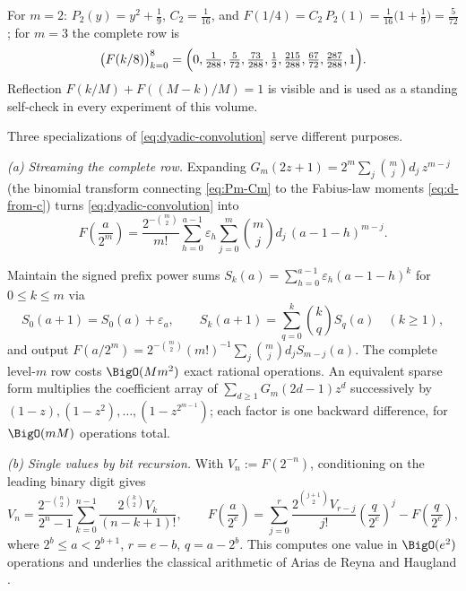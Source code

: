 \documentclass[11pt,oneside]{article}
\numberwithin{equation}{section}
\theoremstyle{definition}
\theoremstyle{remark}
\newcommand{\eps}{\varepsilon}
\begin{document}
\begin{example}
For $m=2$: $P_2(y)=y^2+\tfrac19$, $C_2=\tfrac1{16}$, and
$F(1/4)=C_2\,P_2(1)=\tfrac1{16}\bigl(1+\tfrac19\bigr)
=\tfrac5{72}$; for $m=3$ the complete row is
\[
 \bigl(F(k/8)\bigr)_{k=0}^{8}
 =\Bigl(0,\tfrac1{288},\tfrac5{72},\tfrac{73}{288},\tfrac12,
 \tfrac{215}{288},\tfrac{67}{72},\tfrac{287}{288},1\Bigr).
\]
Reflection $F(k/M)+F((M-k)/M)=1$ is visible and is used as a standing
self-check in every experiment of this volume.
\end{example}

Three specializations of \eqref{eq:dyadic-convolution} serve different
purposes.

\emph{(a) Streaming the complete row.}  Expanding
$G_m(2z+1)=2^m\sum_{j}\binom mj d_j\,z^{m-j}$ (the binomial transform
connecting \eqref{eq:Pm-Cm} to the Fabius-law moments
\eqref{eq:d-from-c}) turns \eqref{eq:dyadic-convolution} into
\begin{equation}
 F\!\left(\frac{a}{2^{m}}\right)
 =\frac{2^{-\binom m2}}{m!}
 \sum_{h=0}^{a-1}\eps_h
 \sum_{j=0}^{m}\binom mj d_j\,(a-1-h)^{m-j}.
 \label{eq:exact-dyadic-d}
\end{equation}

\begin{algorithm}
\label{alg:stream}
Maintain the signed prefix power sums
$S_k(a)=\sum_{h=0}^{a-1}\eps_h(a-1-h)^k$ for $0\le k\le m$ via
\[
 S_0(a+1)=S_0(a)+\eps_a,
 \qquad
 S_k(a+1)=\sum_{q=0}^{k}\binom kq S_q(a)\quad(k\ge1),
\]
and output
$F(a/2^m)=2^{-\binom m2}(m!)^{-1}\sum_j\binom mj d_j S_{m-j}(a)$.  The
complete level-$m$ row costs $\BigO(M m^2)$ exact rational operations.
An equivalent sparse form multiplies the coefficient array of
$\sum_{d\ge1}G_m(2d-1)z^d$ successively by
$(1-z),(1-z^2),\dots,(1-z^{2^{m-1}})$; each factor is one backward
difference, for $\BigO(mM)$ operations total.
\end{algorithm}

\emph{(b) Single values by bit recursion.}  With
$V_n:=F(2^{-n})$, conditioning on the leading binary digit gives
\begin{equation}
 V_n=\frac{2^{-\binom n2}}{2^{n}-1}
 \sum_{k=0}^{n-1}\frac{2^{\binom k2}V_k}{(n-k+1)!},
 \qquad
 F\!\left(\frac{a}{2^{e}}\right)
 =\sum_{j=0}^{r}\frac{2^{\binom{j+1}2}V_{r-j}}{j!}
 \left(\frac{q}{2^{e}}\right)^{j}
 -F\!\left(\frac{q}{2^{e}}\right),
 \label{eq:bit-recursion}
\end{equation}
where $2^{b}\le a<2^{b+1}$, $r=e-b$, $q=a-2^{b}$.  This computes one
value in $\BigO(e^2)$ operations and underlies the classical arithmetic
of Arias de Reyna and Haugland \cite{AriasArithmetic,Haugland2016}.
\end{document}
